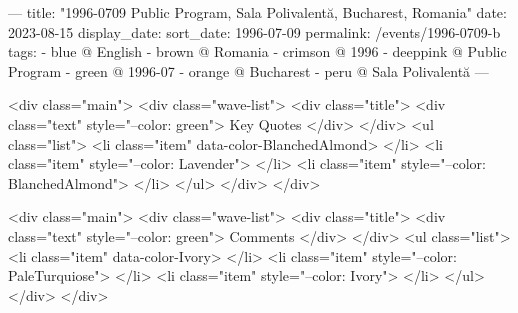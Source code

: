 ---
title: "1996-0709 Public Program, Sala Polivalentă, Bucharest, Romania"
date: 2023-08-15
display_date: 
sort_date: 1996-07-09
permalink: /events/1996-0709-b
tags:
  - blue @ English
  - brown @ Romania
  - crimson @ 1996
  - deeppink @ Public Program
  - green @ 1996-07
  - orange @ Bucharest
  - peru @ Sala Polivalentă
---

<div class="main">
  <div class="wave-list">
    <div class="title">
      <div class="text" style="--color: green">
        Key Quotes
      </div>
    </div>
    <ul class="list">
        <li class="item" data-color-BlanchedAlmond>
        </li>
        <li class="item" style="--color: Lavender">
        </li>
        <li class="item" style="--color: BlanchedAlmond">
        </li>
      </ul>
  </div>
</div>

<div class="main">
  <div class="wave-list">
    <div class="title">
      <div class="text" style="--color: green">
        Comments
      </div>
    </div>
    <ul class="list">
        <li class="item" data-color-Ivory>
        </li>
        <li class="item" style="--color: PaleTurquiose">
        </li>
        <li class="item" style="--color: Ivory">
        </li>
      </ul>
  </div>
</div>